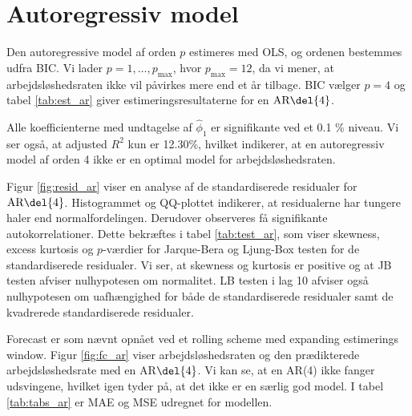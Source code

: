 \section{Autoregressiv model}
Den autoregressive model af orden \(p\) estimeres med OLS, og ordenen bestemmes udfra BIC.
Vi lader $p = 1, \ldots, p_{\max}$, hvor \(p_\text{max}=12\), da vi mener, at arbejdsløshedsraten ikke vil påvirkes mere end et år tilbage.
BIC vælger \(p=4\) og tabel \ref{tab:est_ar} giver estimeringsresultaterne for en \(\text{AR} \del{4}\).
%


Alle koefficienterne med undtagelse af $\widehat\phi_1$ er signifikante ved et 0.1 \% niveau. 
Vi ser også, at adjusted $R^2$ kun er 12.30\%, hvilket indikerer, at en autoregressiv model af orden 4 ikke er en optimal model for arbejdsløshedsraten. 

Figur \ref{fig:resid_ar} viser en analyse af de standardiserede residualer for \(\text{AR} \del{4}\). 
Histogrammet og QQ-plottet indikerer, at residualerne har tungere haler end normalfordelingen. 
Derudover observeres få signifikante autokorrelationer.
Dette bekræftes i tabel \ref{tab:test_ar}, som viser skewness, excess kurtosis og \(p\)-værdier for Jarque-Bera og Ljung-Box testen for de standardiserede residualer. 
Vi ser, at skewness og kurtosis er positive og at JB testen afviser nulhypotesen om normalitet. 
LB testen i lag 10 afviser også nulhypotesen om uafhængighed for både de standardiserede residualer samt de kvadrerede standardiserede residualer. 
%

%

Forecast er som nævnt opnået ved et rolling scheme med expanding estimerings window. 
Figur \ref{fig:fc_ar} viser arbejdsløshedsraten og den prædikterede arbejdsløshedsrate med en AR\(\del{4}\).
Vi kan se, at en AR(4) ikke fanger udsvingene, hvilket igen tyder på, at det ikke er en særlig god model. 
I tabel \ref{tab:tabs_ar} er MAE og MSE udregnet for modellen. 



\newpage
